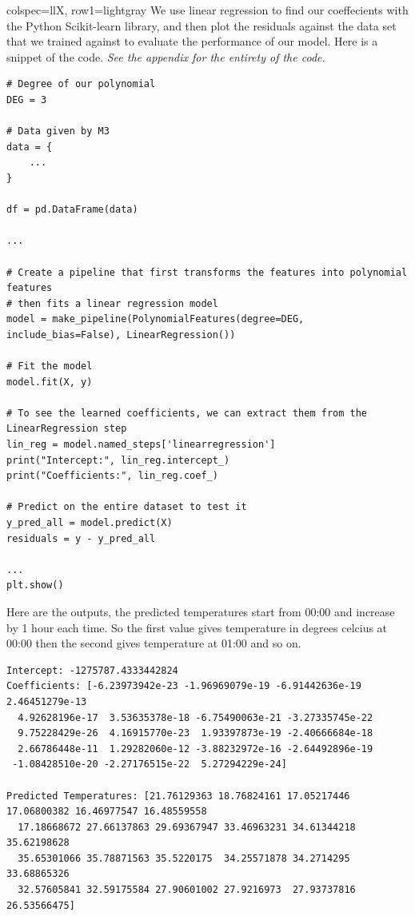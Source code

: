 \documentclass[11pt]{article}
\begin{document}
\begin{longtblr}[
  caption={Variables and parameters.}
]{
  colspec={llX},
  row{1}={lightgray}
}
We use linear regression to find our coeffecients with the Python Scikit-learn library, and then plot the residuals against
the data set that we trained against to evaluate the performance of our model. Here is a snippet of the code.
\textit{See the appendix for the entirety of the code.}

\begin{verbatim}
# Degree of our polynomial
DEG = 3

# Data given by M3
data = {
    ...
}

df = pd.DataFrame(data)

...

# Create a pipeline that first transforms the features into polynomial features
# then fits a linear regression model
model = make_pipeline(PolynomialFeatures(degree=DEG, include_bias=False), LinearRegression())

# Fit the model
model.fit(X, y)

# To see the learned coefficients, we can extract them from the LinearRegression step
lin_reg = model.named_steps['linearregression']
print("Intercept:", lin_reg.intercept_)
print("Coefficients:", lin_reg.coef_)

# Predict on the entire dataset to test it
y_pred_all = model.predict(X)
residuals = y - y_pred_all

...
plt.show()
\end{verbatim}

Here are the outputs, the predicted temperatures start from 00:00 and increase by 1 hour each time. So the first value gives
temperature in degrees celcius at 00:00 then the second gives temperature at 01:00 and so on.
\label{sec:results1}
\begin{verbatim}
Intercept: -1275787.4333442824
Coefficients: [-6.23973942e-23 -1.96969079e-19 -6.91442636e-19  2.46451279e-13
  4.92628196e-17  3.53635378e-18 -6.75490063e-21 -3.27335745e-22
  9.75228429e-26  4.16915770e-23  1.93397873e-19 -2.40666684e-18
  2.66786448e-11  1.29282060e-12 -3.88232972e-16 -2.64492896e-19
 -1.08428510e-20 -2.27176515e-22  5.27294229e-24]

Predicted Temperatures: [21.76129363 18.76824161 17.05217446 17.06800382 16.46977547 16.48559558
  17.18668672 27.66137863 29.69367947 33.46963231 34.61344218 35.62198628
  35.65301066 35.78871563 35.5220175  34.25571878 34.2714295  33.68865326
  32.57605841 32.59175584 27.90601002 27.9216973  27.93737816 26.53566475]
\end{verbatim}


\end{longtblr}
\end{document}
